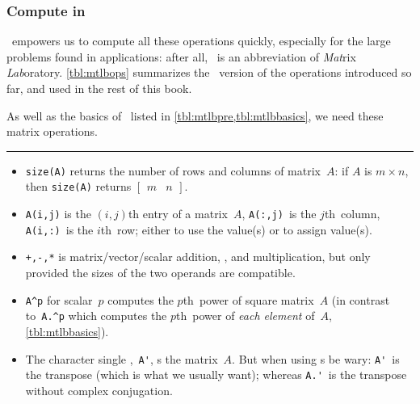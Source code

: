 





\subsubsection{Compute in \script}

\script\ empowers us to compute all these operations quickly, especially for the large problems found in applications: after all, \script[1]\ is an abbreviation of \emph{Mat}rix \emph{Lab}oratory.
\autoref{tbl:mtlbops} summarizes the \script\ version of the operations introduced so far, and used in the rest of this book.

\begin{table}
\caption{As well as the basics of \script\ listed in \autoref{tbl:mtlbpre,tbl:mtlbbasics},  we need these matrix operations.} \label{tbl:mtlbops}
\hrule
\begin{minipage}{\linewidth}
\begin{itemize}
\item {}\verb|size(A)| returns the number of rows and columns of matrix~\(A\): if \(A\) is \(m\times n\), then \verb|size(A)| returns \(\begin{bmatrix} m&n \end{bmatrix}\).
\item \verb|A(i,j)| is the \((i,j)\)th entry of a matrix~\(A\), \verb|A(:,j)|~is the \(j\)th~column, \verb|A(i,:)|~is the \(i\)th~row; either to use the value(s) or to assign value(s).
\item {}\verb|+,-,*| is matrix\slash vector\slash scalar addition, , and multiplication, but only provided the sizes of the two operands are compatible.
\item \verb|A^p| for scalar~\(p\) computes the \(p\)th~power of square matrix~\(A\) (in contrast to~\verb|A.^p| which  computes the \(p\)th~power of \emph{each element} of~\(A\), \autoref{tbl:mtlbbasics}).
\item The character single ,~\verb|A'|, s the matrix~\(A\).  
But when using s be wary: \verb|A'|~is the  transpose (which is what we usually want); whereas \verb|A.'|~is the transpose without complex conjugation.

\end{itemize}
\end{minipage}
\end{table}
